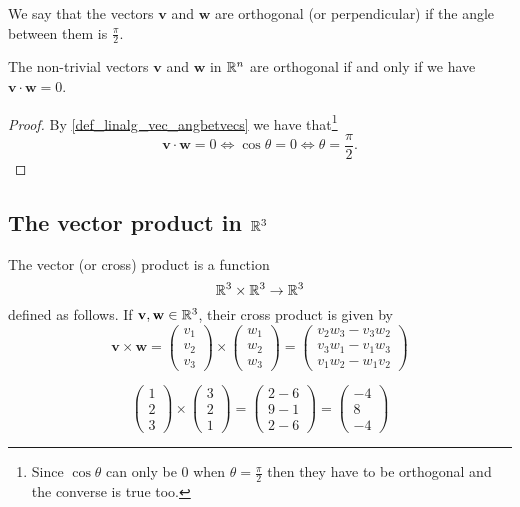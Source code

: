 \documentclass[10pt, a4paper]{article}
\newcommand{\mbf}[1]{\mathbf{#1}}
\begin{document}
We say that the vectors $\mbf{v}$ and $\mbf{w}$ are orthogonal (or perpendicular) if the angle between them is $\frac{\pi}{2}$. \\

\begin{corollary}
    The non-trivial vectors $\mbf{v}$ and $\mbf{w}$ in $\mathbb{R} ^ n$ are orthogonal if and only if we have $\mbf{v \cdot w} = 0$.

    \begin{proof}
        By \autoref{def_linalg_vec_angbetvecs} we have that\footnote{Since $\cos\theta$ can only be $0$ when $\theta = \frac{\pi}{2}$ then they have to be orthogonal and the converse is true too.}
        \[
        \mbf{v \cdot w} = 0 \iff \cos\theta = 0 \iff \theta = \frac{\pi}{2}.
        \]
    \end{proof}
\end{corollary}

\subsection{The vector product in $\mathbb{R} ^ 3$}
\begin{definition}
    The vector (or cross) product is a function
    \[
    \mathbb{R} ^ 3 \times \mathbb{R} ^ 3 \rightarrow \mathbb{R} ^ 3
    \]
    defined as follows. If $\mbf{v, w} \in \R ^ 3$, their cross product is given by
    \[
    \mbf{v \times w} =
    \begin{pmatrix} v_1 \\ v_2 \\ v_3 \end{pmatrix}
    \times
    \begin{pmatrix} w_1 \\ w_2 \\ w_3 \end{pmatrix}
    =
    \begin{pmatrix} v_2 w_3 - v_3 w_2 \\ v_3 w_1 - v_1 w_3 \\ v_1 w_2 - w_1 v_2 \end{pmatrix}
    \]
\end{definition}

\begin{example}
    \[
    \begin{pmatrix}
        1 \\ 2 \\ 3
    \end{pmatrix}
    \times
    \begin{pmatrix}
        3 \\ 2 \\ 1
    \end{pmatrix}
    = \begin{pmatrix}
        2 - 6 \\
        9 - 1 \\
        2 - 6
    \end{pmatrix}
    =
    \begin{pmatrix}
        -4 \\ 8 \\ -4
    \end{pmatrix}
    \]
\end{example}
\end{document}
